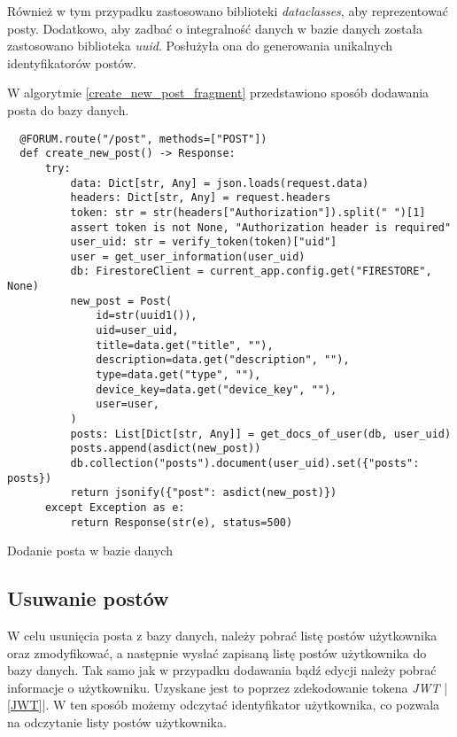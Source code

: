 Również w tym przypadku zastosowano biblioteki \textit{dataclasses}, aby reprezentować posty. Dodatkowo, aby zadbać o integralność danych w bazie danych została zastosowano biblioteka \textit{uuid}. Posłużyła ona do generowania unikalnych identyfikatorów postów.

W algorytmie \ref{create_new_post_fragment} przedstawiono sposób dodawania posta do bazy danych.

\begin{code}[H]
  \begin{verbatim}
  @FORUM.route("/post", methods=["POST"])
  def create_new_post() -> Response:
      try:
          data: Dict[str, Any] = json.loads(request.data)
          headers: Dict[str, Any] = request.headers
          token: str = str(headers["Authorization"]).split(" ")[1]
          assert token is not None, "Authorization header is required"
          user_uid: str = verify_token(token)["uid"]
          user = get_user_information(user_uid)
          db: FirestoreClient = current_app.config.get("FIRESTORE", None)
          new_post = Post(
              id=str(uuid1()),
              uid=user_uid,
              title=data.get("title", ""),
              description=data.get("description", ""),
              type=data.get("type", ""),
              device_key=data.get("device_key", ""),
              user=user,
          )
          posts: List[Dict[str, Any]] = get_docs_of_user(db, user_uid)
          posts.append(asdict(new_post))
          db.collection("posts").document(user_uid).set({"posts": posts})
          return jsonify({"post": asdict(new_post)})
      except Exception as e:
          return Response(str(e), status=500)
  \end{verbatim}
  \caption{Dodanie posta w bazie danych}
  \label{create_new_post_fragment}
\end{code}

\subsection{Usuwanie postów}
W celu usunięcia posta z bazy danych, należy pobrać listę postów użytkownika oraz zmodyfikować, a następnie wysłać zapisaną listę postów użytkownika do bazy danych. Tak samo jak w przypadku dodawania bądź edycji należy pobrać informacje o użytkowniku. Uzyskane jest to poprzez zdekodowanie tokena \textit{JWT} |\ref{JWT}|. W ten sposób możemy odczytać identyfikator użytkownika, co pozwala na odczytanie listy postów użytkownika.


